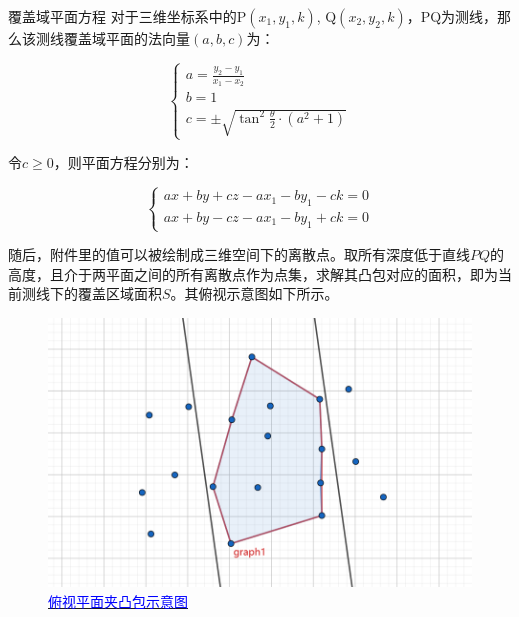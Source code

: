 \begin{mcmTheorem}{覆盖域平面方程}
    对于三维坐标系中的P$(x_1, y_1, k)$, Q$(x_2, y_2, k)$，PQ为测线，那么该测线覆盖域平面的法向量$(a, b, c)$为：

    \begin{equation}
        \begin{cases}
            a = \frac{y_2-y_1}{x_1-x_2} \\
            b = 1                       \\
            c = \pm \sqrt{\tan^2\frac{\theta}{2} \cdot (a^2+1)}
        \end{cases}
    \end{equation}

    令$c \geq 0$，则平面方程分别为：

    \begin{equation}
        \begin{cases}
            ax + by + cz - ax_1 - by_1 - ck = 0 \\
            ax + by - cz - ax_1 - by_1 + ck = 0
        \end{cases}
    \end{equation}
\end{mcmTheorem}

随后，附件里的值可以被绘制成三维空间下的离散点。取所有深度低于直线$PQ$的高度，且介于两平面之间的所有离散点作为点集，求解其凸包对应的面积，即为当前测线下的覆盖区域面积$S$。其俯视示意图如下所示。

\begin{figure}[h]
    \centering
    \includegraphics[scale=0.3]{res/img/俯视平面夹凸包示意图.png}
    \caption{\href{https://www.geogebra.org/m/vndf5wzp}{\textcolor{blue}{俯视平面夹凸包示意图}}}
    \label{fig:俯视平面夹凸包示意图}
\end{figure}

